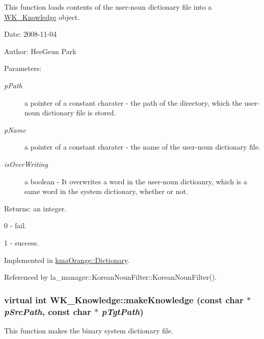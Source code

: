 This function loads contents of the user-noun dictionary file into a \hyperlink{classWK__Knowledge}{WK\_\-Knowledge} object. 

\begin{Desc}
\item[Date:]2008-11-04 \end{Desc}
\begin{Desc}
\item[Author:]HeeGeun Park \end{Desc}
\begin{Desc}
\item[Parameters:]
\begin{description}
\item[{\em pPath}]a pointer of a constant charater - the path of the directory, which the user-noun dictionary file is stored. \item[{\em pName}]a pointer of a constant charater - the name of the user-noun dictionary file. \item[{\em isOverWriting}]a boolean - It overwrites a word in the user-noun dictioanry, which is a same word in the system dictionary, whether or not. \end{description}
\end{Desc}
\begin{Desc}
\item[Returns:]an integer.\par
 0 - fail.\par
 1 - success. \end{Desc}


Implemented in \hyperlink{classkmaOrange_1_1Dictionary_c0b9ddb423ad674ff15a77ee9663a641}{kmaOrange::Dictionary}.

Referenced by la\_\-manager::KoreanNounFilter::KoreanNounFilter().\hypertarget{classWK__Knowledge_0ad630181c1519d316d2d2cdf28a270e}{
\subsubsection[{makeKnowledge}]{\setlength{\rightskip}{0pt plus 5cm}virtual int WK\_\-Knowledge::makeKnowledge (const char $\ast$ {\em pSrcPath}, \/  const char $\ast$ {\em pTgtPath})}}
\label{classWK__Knowledge_0ad630181c1519d316d2d2cdf28a270e}


This function makes the binary system dictionary file. 

